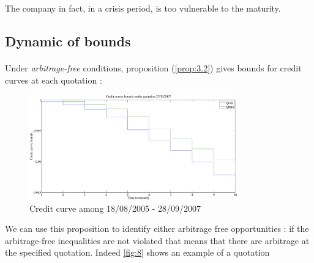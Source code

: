 The company in fact, in a crisis period, is too vulnerable to the maturity. 

\subsection{Dynamic of bounds }
\label{sec:dynamic-bounds-}

\paragraph{}
Under  \textit{arbitrage-free}  conditions, proposition  (\ref{prop:3.2})  gives
bounds for credit curves at each quotation :
\begin{figure}[H]

  \centering
  \includegraphics[width=0.8\textwidth]{cotation_27_11_2007}
  \caption{Credit curve among 18/08/2005 - 28/09/2007}
\label{fig7}
\end{figure}

We can  use this  proposition to
identify   either  arbitrage   free  opportunities   :  if   the  arbitrage-free
inequalities  are not  violated  that  means that  there  are  arbitrage at  the
specified quotation. Indeed \ref{fig:8} shows an example of a quotation 


